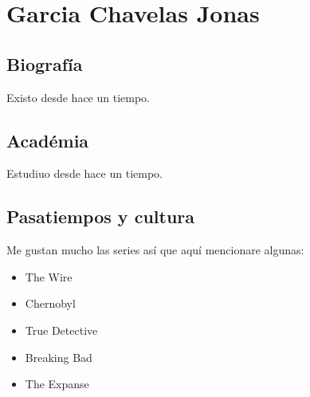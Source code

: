 \chapter{Garcia Chavelas Jonas}

\section{Biografía}
Existo desde hace un tiempo.

\section{Académia}
Estudiuo desde hace un tiempo.

\section{Pasatiempos y cultura}
Me gustan mucho las series así que aquí mencionare algunas:
\begin{itemize}
\item The Wire
\item Chernobyl
\item True Detective
\item Breaking Bad
\item The Expanse
\end{itemize}
